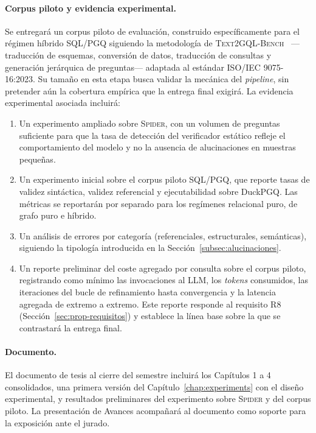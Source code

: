 \paragraph{Corpus piloto y evidencia experimental.} Se entregará un corpus piloto de evaluación, construido específicamente para el régimen híbrido \ac{SQL}/\ac{PGQ} siguiendo la metodología de \textsc{Text2GQL-Bench}~\cite{text2gqlbench} ---traducción de esquemas, conversión de datos, traducción de consultas y generación jerárquica de preguntas--- adaptada al estándar ISO/IEC 9075-16:2023. Su tamaño en esta etapa busca validar la mecánica del \emph{pipeline}, sin pretender aún la cobertura empírica que la entrega final exigirá. La evidencia experimental asociada incluirá:

\begin{enumerate}
    \item Un experimento ampliado sobre \textsc{Spider}, con un volumen de preguntas suficiente para que la tasa de detección del verificador estático refleje el comportamiento del modelo y no la ausencia de alucinaciones en muestras pequeñas.
    \item Un experimento inicial sobre el corpus piloto \ac{SQL}/\ac{PGQ}, que reporte tasas de validez sintáctica, validez referencial y ejecutabilidad sobre DuckPGQ. Las métricas se reportarán por separado para los regímenes relacional puro, de grafo puro e híbrido.
    \item Un análisis de errores por categoría (referenciales, estructurales, semánticas), siguiendo la tipología introducida en la Sección~\ref{subsec:alucinaciones}.
    \item Un reporte preliminar del coste agregado por consulta sobre el corpus piloto, registrando como mínimo las invocaciones al \ac{LLM}, los \emph{tokens} consumidos, las iteraciones del bucle de refinamiento hasta convergencia y la latencia agregada de extremo a extremo. Este reporte responde al requisito R8 (Sección~\ref{sec:prop-requisitos}) y establece la línea base sobre la que se contrastará la entrega final.
\end{enumerate}

\paragraph{Documento.} El documento de tesis al cierre del semestre incluirá los Capítulos 1 a 4 consolidados, una primera versión del Capítulo~\ref{chap:experiments} con el diseño experimental, y resultados preliminares del experimento sobre \textsc{Spider} y del corpus piloto. La presentación de Avances acompañará al documento como soporte para la exposición ante el jurado.

